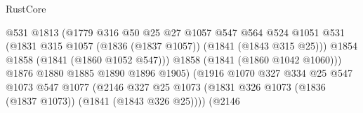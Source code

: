 \begin{lexlean}{RustCore}
\begin{coremodule}
                                              @531
                                              @1813
                                              (@1779
                                                @316
                                                @50
                                                @25
                                                @27
                                                @1057
                                                @547
                                                @564
                                                @524
                                                @1051
                                                @531
                                                (@1831
                                                  @315
                                                  @1057
                                                  (@1836 (@1837 @1057))
                                                  (@1841 (@1843 @315 @25)))
                                                @1854
                                                @1858
                                                (@1841 (@1860 @1052 @547)))
                                              @1858
                                              (@1841 (@1860 @1042 @1060)))
                                            @1876
                                            @1880
                                            @1885
                                            @1890
                                            @1896
                                            @1905)
                                          (@1916
                                            @1070
                                            @327
                                            @334
                                            @25
                                            @547
                                            @1073
                                            @547
                                            @1077
                                            (@2146
                                              @327
                                              @25
                                              @1073
                                              (@1831
                                                @326
                                                @1073
                                                (@1836 (@1837 @1073))
                                                (@1841 (@1843 @326 @25))))
                                            (@2146

\end{coremodule}
\end{lexlean}
